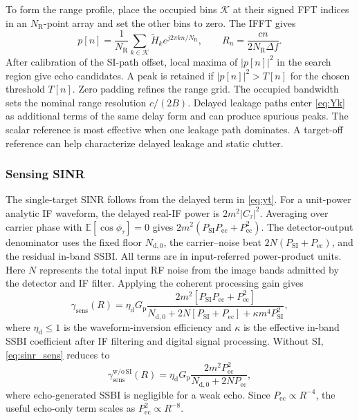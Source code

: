 \documentclass[10pt,journal]{IEEEtran}
\DeclareRobustCommand{\rev}[1]{\textcolor{revisioncolor}{#1}}
\begin{document}
\rev{To form the range profile, place the occupied bins \(\mathcal K\)
at their signed FFT indices in an \(N_{\mathrm R}\)-point array
and set the other bins to zero. The IFFT gives}
{\color{revisioncolor}
\begin{equation}
p[n]=\frac{1}{N_{\mathrm R}}\sum_{k\in\mathcal K}
       \widetilde H_k e^{j2\pi kn/N_{\mathrm R}},\qquad
R_n=\frac{cn}{2N_{\mathrm R}\Delta f}.
\label{eq:slope}
\end{equation}}
\rev{After calibration of the SI-path offset, local maxima of
\(\lvert p[n]\rvert^2\) in the search region give echo candidates.
A peak is retained if \(\lvert p[n]\rvert^2>T[n]\) for the chosen
threshold \(T[n]\). Zero padding refines the range grid. The
occupied bandwidth sets the nominal range resolution \(c/(2B)\).
Delayed leakage paths enter \eqref{eq:Yk} as additional terms of
the same delay form and can produce spurious peaks. The scalar
reference is most effective when one leakage path dominates. A
target-off reference can help characterize delayed leakage and
static clutter.}

\subsubsection{Sensing SINR}

\rev{The single-target SINR follows from the delayed term in
\eqref{eq:yt}. For a unit-power analytic IF waveform, the delayed
real-IF power is \(2m^2|C_\tau|^2\). Averaging over carrier phase
with \(\mathbb E[\cos\phi_\tau]=0\) gives
\(2m^2(P_{\mathrm{SI}}P_{\mathrm{ec}}+P_{\mathrm{ec}}^2)\).
The detector-output denominator uses the fixed floor
\(N_{\mathrm{d},0}\), the carrier--noise beat
\(2N(P_{\mathrm{SI}}+P_{\mathrm{ec}})\), and the residual
in-band SSBI. All terms are in input-referred power-product
units. Here \(N\) represents the total input RF noise from the
image bands admitted by the detector and IF filter. Applying
the coherent processing gain gives}
\begin{equation}
\gamma_{\mathrm{sens}}(R)
=
\eta_{\mathrm d}G_{\mathrm p}
\frac{
2m^2\!\left[
P_{\mathrm{SI}}P_{\mathrm{ec}}
+
P_{\mathrm{ec}}^2
\right]
}{
N_{\mathrm{d},0}
+
2N\!\left[
P_{\mathrm{SI}}+P_{\mathrm{ec}}
\right]
+
\kappa m^4P_{\mathrm{SI}}^2
},
\label{eq:sinr_sens}
\end{equation}
where $\eta_{\mathrm d}\leq1$ is the waveform-inversion efficiency and
$\kappa$ is the effective in-band SSBI coefficient after IF filtering
and digital signal processing. Without SI, \eqref{eq:sinr_sens} reduces to
\begin{equation}
\gamma_{\mathrm{sens}}^{\mathrm{w/o\,SI}}(R)
=
\eta_{\mathrm d}G_{\mathrm p}
\frac{
2m^2P_{\mathrm{ec}}^2
}{
N_{\mathrm{d},0}+2NP_{\mathrm{ec}}
},
\label{eq:sinr_nosi}
\end{equation}
where echo-generated SSBI is negligible for a weak echo. Since
$P_{\mathrm{ec}}\propto R^{-4}$, the useful echo-only term scales as
$P_{\mathrm{ec}}^2\propto R^{-8}$.
\end{document}
